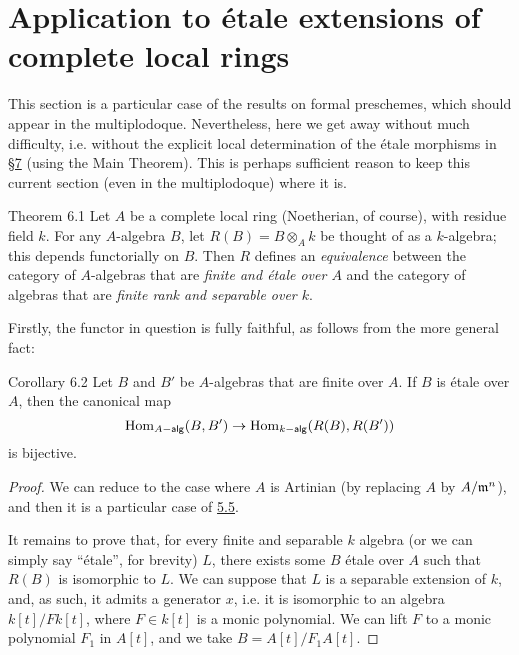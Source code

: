 \section{Application to étale extensions of complete local rings}
\label{I.6}

This section is a particular case of the results on formal preschemes, which should appear in the multiplodoque.
Nevertheless, here we get away without much difficulty, i.e. without the explicit local determination of the étale morphisms in \hyperref[I.7]{\S7} (using the Main Theorem).
This is perhaps sufficient reason to keep this current section (even in the multiplodoque) where it is.

\begin{itenv}{Theorem 6.1}
\label{I.6.1}
  Let $A$ be a complete local ring (Noetherian, of course), with residue field $k$.
  For any $A$-algebra $B$, let $R(B)=B\otimes_Ak$ be thought of as a $k$-algebra;
  this depends functorially on $B$.
  Then $R$ defines an \emph{equivalence} between the category of $A$-algebras that are \emph{finite and étale over $A$} and the category of algebras that are \emph{finite rank and separable over $k$}.
\end{itenv}

Firstly, the functor in question is fully faithful, as follows from the more general fact:

\begin{itenv}{Corollary 6.2}
\label{I.6.2}
  Let $B$ and $B'$ be $A$-algebras that are finite over $A$.
  If $B$ is étale over $A$, then the canonical map
  \[
    \Hom_{\alg{A}}(B,B')
    \to \Hom_{\alg{k}}(R(B),R(B'))
  \]
  is bijective.
\end{itenv}

\begin{proof}
  We can reduce to the case where $A$ is Artinian (by replacing $A$ by $A/\frak{m}^n$), and then it is a particular case of \hyperref[I.5.5]{5.5}.

  It remains to prove that, for every finite and separable $k$ algebra (or we can simply say ``étale'', for brevity) $L$, there exists some $B$ étale over $A$ such that $R(B)$ is isomorphic to $L$.
  We can suppose that $L$ is a separable extension of $k$, and, as such, it admits a generator $x$, i.e. it is isomorphic to an algebra $k[t]/Fk[t]$, where $F\in k[t]$ is a monic polynomial.
  We can lift $F$ to a monic polynomial $F_1$ in $A[t]$, and we take $B=A[t]/F_1A[t]$.
\end{proof}
